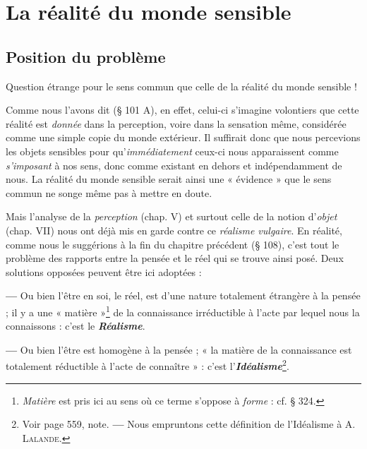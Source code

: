 \chapter{La réalité du monde sensible}
%
%

\section{Position du problème}%
Question étrange pour le sens commun que celle de la réalité du monde sensible !

Comme nous l’avons dit (§ 101 A), en effet, celui-ci s’imagine volontiers
que cette réalité est {\it donnée} dans la perception, voire dans la
sensation même, considérée comme une simple copie du monde
extérieur. Il suffirait donc que nous percevions les objets sensibles
pour qu'{\it immédiatement} ceux-ci nous apparaissent comme {\it s'imposant}
à nos sens, donc comme existant en dehors et indépendamment de
nous. La réalité du monde sensible serait ainsi une « évidence » que
le sens commun ne songe même pas à mettre en doute.

Mais l’analyse de la {\it perception} (chap. V) et surtout celle de la
notion d’{\it objet} (chap. VII) nous ont déjà mis en garde contre ce
{\it réalisme vulgaire}. En réalité, comme nous le suggérions à la fin du
chapitre précédent (§ 108), c’est tout le problème des rapports entre
la pensée et le réel qui se trouve ainsi posé. Deux solutions opposées
peuvent être ici adoptées :

{\bf —} Ou bien l’être en soi, le réel, est d’une nature totalement étrangère
à la pensée ; il y a une « matière »\footnote{{\it Matière} est pris ici au sens où ce
terme s'oppose à {\it forme} : cf. § 324.} de la connaissance irréductible
à l’acte par lequel nous la connaissons : c’est le \textbf{\textit {Réalisme}}.

{\bf —} Ou bien l’être est homogène à la pensée ; « la matière de la connaissance
est totalement réductible à l’acte de connaître » : c’est l’\textbf{\textit {Idéalisme}}\footnote{Voir page 559, note. {\bf —} Nous empruntons cette définition de l’Idéalisme à
A. \textsc{Lalande}.}.

